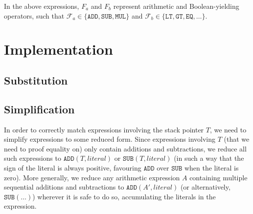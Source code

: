 \documentclass[a4paper]{article}
\begin{document}
In the above expressions, $F_a$ and $F_b$ represent arithmetic and Boolean-yielding operators, such that $\mathcal{F}_a \in \{\mathtt{ADD}, \mathtt{SUB}, \mathtt{MUL}\}$ and $\mathcal{F}_b \in \{\mathtt{LT}, \mathtt{GT}, \mathtt{EQ}, \ldots\}$.

\section{Implementation}

\subsection{Substitution}

\subsection{Simplification}
In order to correctly match expressions involving the stack pointer $T$, we need to simplify expressions to some reduced form. Since expressions involving $T$ (that we need to proof equality on) only contain additions and subtractions, we reduce all such expressions to $\mathtt{ADD}(T, \mathit{literal})$ or $\mathtt{SUB}(T, \mathit{literal})$ (in such a way that the sign of the literal is always positive, favouring $\mathtt{ADD}$ over $\mathtt{SUB}$ when the literal is zero). More generally, we reduce any arithmetic expression $A$ containing multiple sequential additions and subtractions to $\mathtt{ADD}(A', \mathit{literal})$ (or alternatively, $\mathtt{SUB}(\ldots)$) wherever it is safe to do so, accumulating the literals in the expression.
\end{document}
